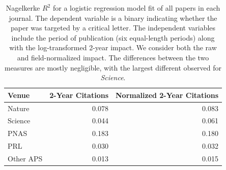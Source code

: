 \documentclass[12pt]{article} %
\begin{document}





\begin{table}[ht]
\scriptsize
\caption{
   Results of one-sample, one-sided Kolmogorov-Smirnov statistical test shown for each of the supplemental journals: \textit{Geology}, \textit{JCP}, and \textit{EST}.
   Mean Rank (referred to in-text as $\mu_{rank}$) denotes the average percentile rank of papers targeted by criticism.
   The test statistic and p-value are the results of a one-sample, one-sided Kolmogorov–Smirnov test that compares the distribution of percentile ranks for targeted papers against a uniform distribution. 
   A low p-value suggests that targeted papers are concentrated among higher ranks than expected compared to the uniform distribution.
$BF_{01}$ denotes the Bayes factor in favor of the null hypothesis (see Supplementary Note 9).
 N is the number of observations in the test and $D$ the Kolmogorov–Smirnov statistic; the 95\% CI is a percentile bootstrap interval (10,000 resamples) for the mean rank.
}
\label{si:table:density-tests_1ks_extra} 
%
\end{table}

\clearpage
\begin{table}[p]
\centering
\caption{
  Nagelkerke $R^2$ for a logistic regression model fit of all papers in each journal. 
  The dependent variable is a binary indicating whether the paper was targeted by a critical letter.
  The independent variables include the period of publication (six equal-length periods) along with the log-transformed 2-year impact. 
  We consider both the raw and field-normalized impact.
  The differences between the two measures are mostly negligible, with the largest different observed for \textit{Science}. 
} 
\label{tab:psuedor2}
\begin{tabular}{lrr}
  \toprule
Venue & 2-Year Citations & Normalized 2-Year Citations \\ 
  \midrule
Nature & 0.078 & 0.083 \\ 
  Science & 0.044 & 0.061 \\ 
  PNAS & 0.183 & 0.180 \\ 
  PRL & 0.030 & 0.032 \\ 
  Other APS & 0.013 & 0.015 \\ 
   \bottomrule
\end{tabular}
\end{table}
\end{document}

